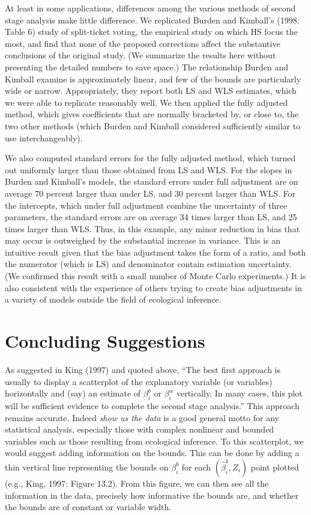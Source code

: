\documentclass[11pt,titlepage]{article}
\begin{document}
At least in some applications, differences among the various methods
of second stage analysis make little difference.  We replicated Burden
and Kimball's (1998: Table 6) study of split-ticket voting, the
empirical study on which HS focus the most, and find that none of the
proposed corrections affect the substantive conclusions of the
original study.  (We summarize the results here without presenting the
detailed numbers to save space.) The relationship Burden and Kimball
examine is approximately linear, and few of the bounds are
particularly wide or narrow.  Appropriately, they report both LS and
WLS estimates, which we were able to replicate reasonably well.  We
then applied the fully adjusted method, which gives coefficients that
are normally bracketed by, or close to, the two other methods (which
Burden and Kimball considered sufficiently similar to use
interchangeably).  

We also computed standard errors for the fully adjusted method, which
turned out uniformly larger than those obtained from LS and WLS.  For
the slopes in Burden and Kimball's models, the standard errors under
full adjustment are on average 70 percent larger than under LS, and 30
percent larger than WLS.  For the intercepts, which under full
adjustment combine the uncertainty of three parameters, the standard
errors are on average 34 times larger than LS, and 25 times larger
than WLS.  Thus, in this example, any minor reduction in bias that may
occur is outweighed by the substantial increase in variance.  This is
an intuitive result given that the bias adjustment takes the form of a
ratio, and both the numerator (which is LS) and denominator contain
estimation uncertainty.  (We confirmed this result with a small number
of Monte Carlo experiments.)  It is also consistent with the
experience of others trying to create bias adjustments in a variety of
models outside the field of ecological inference.

\section{Concluding Suggestions}

As suggested in King (1997) and quoted above, ``The best first
approach is usually to display a scatterplot of the explanatory
variable (or variables) horizontally and (say) an estimate of
$\beta_i^b$ or $\beta_i^w$ vertically.  In many cases, this plot will
be sufficient evidence to complete the second stage analysis.''  This
approach remains accurate.  Indeed \emph{show us the data} is a good
general motto for any statistical analysis, especially those with
complex nonlinear and bounded variables such as those resulting from
ecological inference.  To this scatterplot, we would suggest adding
information on the bounds.  This can be done by adding a thin vertical
line representing the bounds on $\beta_i^b$ for each
$(\hat\beta_i^b,Z_i)$ point plotted (e.g., King, 1997: Figure 13.2).
From this figure, we can then see all the information in the data,
precisely how informative the bounds are, and whether the bounds are
of constant or variable width.
\end{document}
